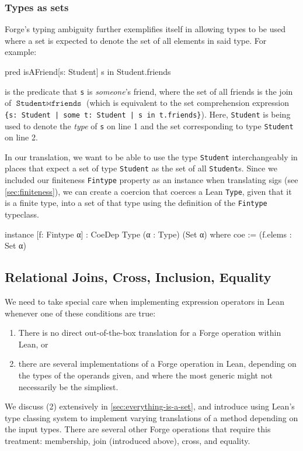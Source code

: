 \subsubsection{Types as sets}
Forge's typing ambiguity further exemplifies itself in allowing types to be used where a set is expected to denote the set of all elements in said type. For example:
\begin{forge}
pred isAFriend[s: Student] {
  s in Student.friends
}
\end{forge}
is the predicate that \texttt{s} is \emph{someone}'s friend, where the set of all friends is the join of $\texttt{Student} \bowtie \texttt{friends}$ (which is equivalent to the set comprehension expression \texttt{\{s: Student | some t: Student | s in t.friends\}}). Here, \texttt{Student} is being used to denote the \emph{type} of \texttt{s} on line 1 and the set corresponding to type \texttt{Student} on line 2. 

In our translation, we want to be able to use the type \texttt{Student} interchangeably in places that expect a set of type \texttt{Student} as the set of all \texttt{Student}s. Since we included our finiteness \texttt{Fintype} property as an instance when translating sigs (see \cref{sec:finiteness}), we can create a coercion that coerces a Lean \texttt{Type}, given that it is a finite type, into a set of that type using the definition of the \texttt{Fintype} typeclass. 
\begin{leanimpl*}
instance [f: Fintype α] : CoeDep Type (α : Type) (Set α) where
  coe := (f.elems : Set α)
\end{leanimpl*}

\subsection{Relational Joins, Cross, Inclusion, Equality}\label{sec:join-cross-subset}

We need to take special care when implementing expression operators in Lean whenever one of these conditions are true: 
\begin{enumerate}[(1)]
  \item There is no direct out-of-the-box translation for a Forge operation within Lean, or
  \item there are several implementations of a Forge operation in Lean, depending on the types of the operands given, and where the most generic might not necessarily be the simpliest. 
\end{enumerate}
We discuss (2) extensively in \cref{sec:everything-is-a-set}, and introduce using Lean's type classing system to implement varying translations of a method depending on the input types. There are several other Forge operations that require this treatment: membership, join (introduced above), cross, and equality. 


